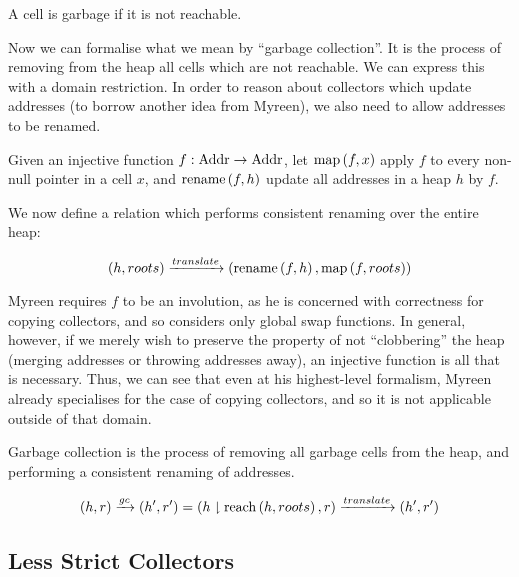 \begin{definition}[Garbage]
  A cell is garbage if it is not reachable.

  \begin{prooftree}
  \end{prooftree}
\end{definition}

Now we can formalise what we mean by ``\gls{garbage collection}''. It
is the process of removing from the heap all \glspl{cell} which are
not reachable. We can express this with a domain
restriction. In order to reason about \glspl{collector} which update
addresses (to borrow another idea from Myreen), we also need to allow
addresses to be renamed.

\begin{definition}[Translation]
  Given an injective function $f : \addr \to \addr$, let $\map{f}{x}$
  apply $f$ to every non-null pointer in a cell $x$, and
  $\rename{f}{h}$ update all addresses in a heap $h$ by $f$.

  We now define a relation which performs consistent renaming over the
  entire heap:

  \[(h, roots) \translate \left(\rename{f}{h}, \map{f}{roots}\right)\]
\end{definition}

Myreen requires $f$ to be an involution, as he is concerned with
correctness for copying collectors, and so considers only global swap
functions. In general, however, if we merely wish to preserve the
property of not ``clobbering'' the heap (merging addresses or throwing
addresses away), an injective function is all that is necessary. Thus,
we can see that even at his highest-level formalism, Myreen already
specialises for the case of copying collectors, and so it is not
applicable outside of that domain.

\begin{definition}
  Garbage collection is the process of removing all garbage cells from
  the heap, and performing a consistent renaming of addresses.

  \[(h, r) \gc (h', r') = (h \restrict \reach{h}{roots}, r) \translate
  (h', r')\]
\end{definition}

\subsection{Less Strict Collectors}

